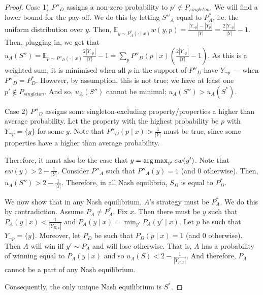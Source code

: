\begin{proof}
Case 1) $P''_D$ assigns a non-zero probability to $p' \not\in P_\mathit{singleton}$. We will find a lower bound for the pay-off. We do this by letting $S''_A $ equal to $P^*_A$, i.e. the uniform distribution over $y$. Then, $\mathbb{E}_{y \sim P_A^*(\cdot \mid x)}w(y, p) = \frac{|Y_{\neg p}| - |Y_p|}{|Y|} = \frac{2|Y_{\neg p}|}{|Y|} - 1$. %
Then, plugging in, we get that $u_A(S'') = \mathbb{E}_{p \sim P''_D(\cdot \mid x)} \frac{2|Y_{\neg p}|}{|Y|} - 1 = \sum_p P''_D(p \mid x)\left(\frac{2|Y_{\neg p}|}{|Y|} - 1\right)$. As this is a weighted sum, it is minimised when all $p$ in the support of $P''_D$ have $Y_{\neg p}$ --- when $P''_D = P^*_D$. However, by assumption, this is not true; we have at least one $p' \notin P_\mathit{singleton}$. And so, $u_A(S'')$ cannot be minimal; $u_A(S'') > u_A(S^*)$.

Case 2) $P''_D$  assigns some singleton-excluding property/properties a higher than average probability. Let the property with the highest probability be $p$ with $Y_{\neg p} = \{y\}$ for some $y$. Note that $P''_D(p \mid x) > \frac{1}{|Y|}$ must be true, since some properties have a higher than average probability.

Therefore, it must also be the case that $y = \operatorname*{arg\,max}_{y'} ew(y')$. %
Note that $ew(y) > 2 - \frac{1}{|Y|}$. %
Consider $P''_A$ such that $P''_A(y) = 1$ (and $0$ otherwise). Then, $u_A(S'') > 2 - \frac{1}{|Y|}$.
Therefore, in all Nash equilibria, $S_D$ is equal to $P^*_D$.


We now show that in any Nash equilibrium, $A$'s strategy must be $P^*_A$. We do this by contradiction. Assume $P_A \ne P^*_A$. Fix $x$. Then there must be $y$ such that $P_A(y \mid x) < \frac{1}{|Y_{R, x}|}$ and $P_A(y \mid x) = \min_{y'} P_A(y' \mid x)$. Let $p$ be such that $Y_{\neg p} = \{y\}$. Moreover, let $P_D$ be such that $P_D(p \mid x) = 1$ (and $0$ otherwise). Then $A$ will win iff $y' \sim P_A$  and will lose otherwise.  That is, $A$ has a probability of winning equal to $P_A(y \mid x)$ and so $u_A(S) < 2 - \frac{1}{|Y_{R, x}|}$. %
And therefore, $P_A$ cannot be a part of any Nash equilibrium.

Consequently, the only unique Nash equilibrium is $S^*$.
\end{proof}

